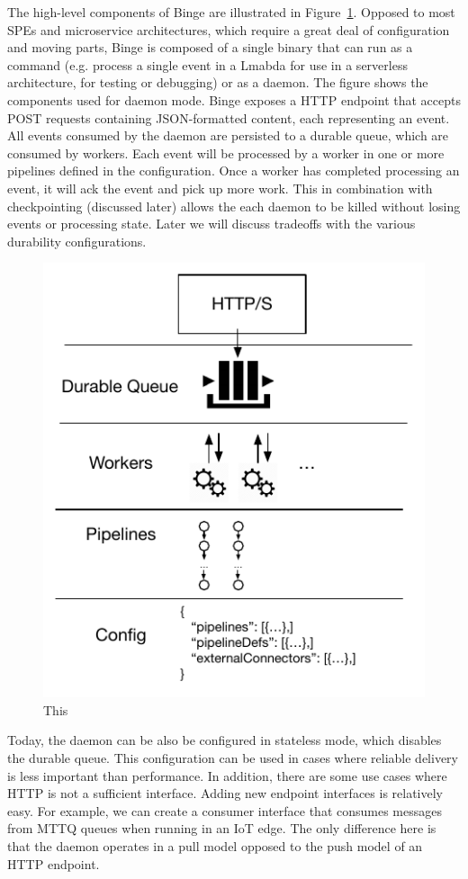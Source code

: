 \documentclass[10pt,twocolumn]{article}
\begin{document}
The high-level components of Binge are illustrated in
Figure~\ref{fig:binge-daemon}.  Opposed to most SPEs and microservice
architectures, which require a great deal of configuration and moving parts,
Binge is composed of a single binary that can run as a  command (e.g.
process a single event in a Lmabda for use in a serverless architecture, for
testing or debugging) or as a daemon.  The figure shows the components used for
daemon mode.  Binge exposes a HTTP endpoint that accepts POST requests
containing JSON-formatted content, each representing an event.  All events
consumed by the daemon are persisted to a durable queue, which are consumed by
workers.  Each event will be processed by a worker in one or more pipelines
defined in the configuration.  Once a worker has completed processing an event,
it will ack the event and pick up more work.  This in combination with
checkpointing (discussed later) allows the each daemon to be killed without
losing events or processing state.  Later we will discuss tradeoffs with the
various durability configurations. 

\begin{figure}[h]
\centering
\includegraphics[scale=0.60]{figures/binge-daemon.pdf}
\caption{This}
\label{fig:binge-daemon}
\end{figure}

Today, the daemon can be also be configured in stateless mode, which disables
the durable queue.  This configuration can be used in cases where reliable
delivery is less important than performance.  In addition, there are some use
cases where HTTP is not a sufficient interface.  Adding new endpoint interfaces
is relatively easy.  For example, we can create a consumer interface that
consumes messages from MTTQ queues when running in an IoT edge.  The only
difference here is that the daemon operates in a pull model opposed to the push
model of an HTTP endpoint.
\end{document}
